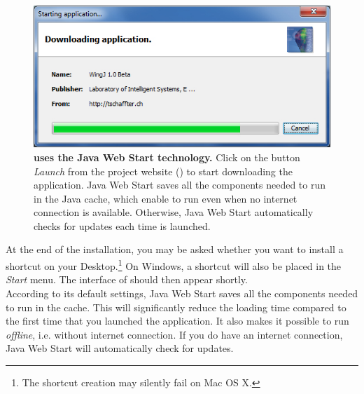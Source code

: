 \begin{figure}[!h]
\centering
\includegraphics[scale=0.5]{images/download_wingj.jpg}
\caption{\textbf{\wingj uses the Java Web Start technology.} Click on the button \textit{Launch \wingj} from the project website (\wingjShortUrl) to start downloading the application. Java Web Start saves all the components needed to run \wingj in the Java cache, which enable to run \wingj even when no internet connection is available. Otherwise, Java Web Start automatically checks for updates each time \wingj is launched.}
\label{fig:download_wingj}
\end{figure}


At the end of the installation, you may be asked whether you want to install a shortcut on your Desktop.\footnote{The shortcut creation may silently fail on Mac OS X.} On Windows, a shortcut will also be placed in the \textit{Start} menu. The interface of \wingj should then appear shortly.\\

According to its default settings, Java Web Start saves all the components needed to run \wingj in the cache. This will significantly reduce the loading time compared to the first time that you launched the application. It also makes it possible to run \wingj \textit{offline}, i.e. without internet connection. If you do have an internet connection, Java Web Start will automatically check for \wingj updates.

